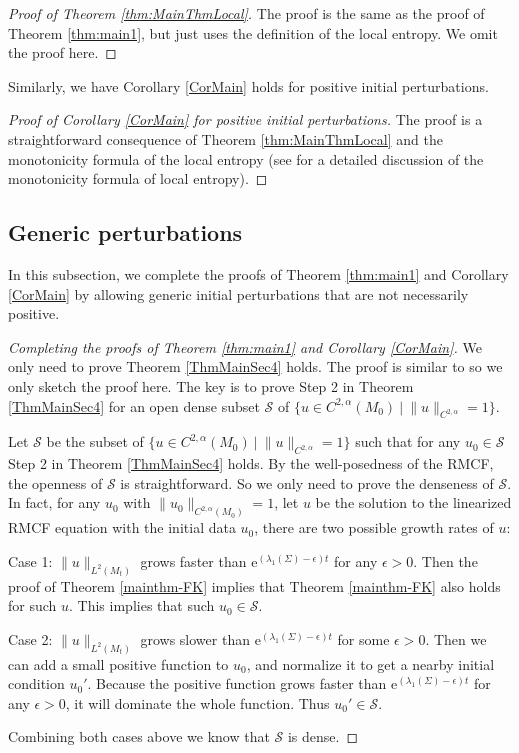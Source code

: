 \documentclass[12pt]{amsart}
\numberwithin{equation}{section}
\numberwithin{equation}{section}
\newcommand{\cS}{\mathcal{S}}
\begin{document}
	\begin{proof}[Proof of Theorem \ref{thm:MainThmLocal}]
		The proof is the same as the proof of Theorem \ref{thm:main1}, but just uses the definition of the local entropy. We omit the proof here.
	\end{proof}
	
	Similarly, we have Corollary \ref{CorMain} holds for positive initial perturbations. 
	
	\begin{proof}[Proof of Corollary \ref{CorMain}  for positive initial perturbations]
		
		The proof is a straightforward consequence of Theorem \ref{thm:MainThmLocal} and the monotonicity formula of the local entropy (see \cite{Su} for a detailed discussion of the monotonicity formula of local entropy).
	\end{proof}
	\subsection{Generic perturbations}\label{SSGeneric}
	In this subsection, we complete the proofs of Theorem \ref{thm:main1} and Corollary \ref{CorMain} by allowing generic initial perturbations that are not necessarily positive. 
	
	
	
	\begin{proof}[Completing the proofs of Theorem \ref{thm:main1} and Corollary \ref{CorMain}]
		We only need to prove Theorem \ref{ThmMainSec4} holds. The proof is similar to \cite[Theorem 3.11]{SX} so we only sketch the proof here. The key is to prove Step 2 in Theorem \ref{ThmMainSec4} for an open dense subset $\cS$ of $\{u\in C^{2,\alpha}(M_0)\ |\ \|u\|_{C^{2,\alpha}}=1\}$.
		
		Let $\cS$ be the subset of $\{u\in C^{2,\alpha}(M_0)\ |\ \|u\|_{C^{2,\alpha}}=1\}$ such that for any $u_0\in \cS$ Step 2 in Theorem \ref{ThmMainSec4} holds. By the well-posedness of the RMCF, the openness of $\cS$ is straightforward. So we only need to prove the denseness of $\cS$. In fact, for any $u_0$ with $\|u_0\|_{C^{2,\alpha}(M_0)}=1$, let $u$ be the solution to the linearized RMCF equation with the initial data $u_0$, there are two possible growth rates of $u$:
		
		Case 1: $\|u\|_{L^2(M_t)}$ grows faster than $\mathrm{e}^{(\lambda_1(\Sigma)-\epsilon)t}$ for any $\epsilon>0$. Then the proof of Theorem \ref{mainthm-FK} implies that Theorem \ref{mainthm-FK} also holds for such $u$. This implies that such $u_0\in\cS$.
		
		Case 2: $\|u\|_{L^2(M_t)}$ grows slower than $\mathrm{e}^{(\lambda_1(\Sigma)-\epsilon)t}$ for some $\epsilon>0$. Then we can add a small positive function to $u_0$, and normalize it to get a nearby initial condition $u_0'$. Because the positive function grows faster than $\mathrm{e}^{(\lambda_1(\Sigma)-\epsilon)t}$ for any $\epsilon>0$, it will dominate the whole function. Thus $u_0'\in\cS$. 
		
		Combining both cases above we know that $\cS$ is dense. 
	\end{proof}
\end{document}
